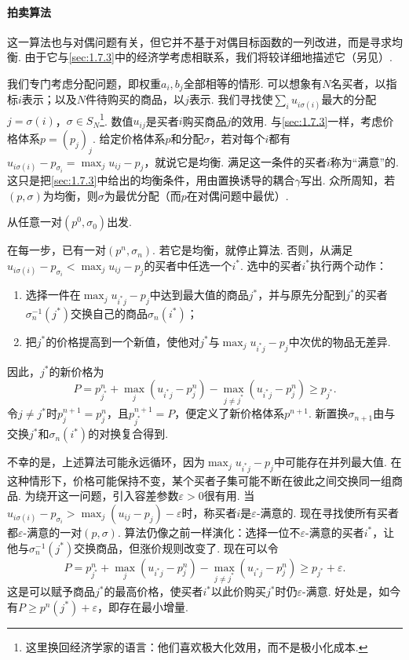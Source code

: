 \paragraph{拍卖算法}
\label{idx:i13-p238}
这一算法也与对偶问题有关，但它并不基于对偶目标函数的一列改进，而是寻求均衡. 由于它与\autoref{sec:1.7.3}中的经济学考虑相联系，我们将较详细地描述它（另见\cite{b53}）.

\label{idx:i11-p238}
我们专门考虑分配问题，即权重$a_i,b_j$全部相等的情形. 可以想象有$N$名买者，以指标$i$表示；以及$N$件待购买的商品，以$j$表示. 我们寻找使$\sum_i u_{i\sigma(i)}$最大的分配$j=\sigma(i)$，$\sigma\in S_N$\footnote{这里换回经济学家的语言：他们喜欢极大化效用，而不是极小化成本.}. 数值$u_{ij}$是买者$i$购买商品$j$的效用. 与\autoref{sec:1.7.3}一样，考虑价格体系$p=(p_j)_j$. \label{idx:i53-p238}
给定价格体系$p$和分配$\sigma$，若对每个$i$都有$u_{i\sigma(i)}-p_{\sigma_i}=\max_j u_{ij}-p_j$，就说它是均衡. 满足这一条件的买者$i$称为“满意”的. 这只是把\autoref{sec:1.7.3}中给出的均衡条件，用由置换诱导的耦合$\gamma$写出. 众所周知，若$(p,\sigma)$为均衡，则$\sigma$为最优分配（而$p$在对偶问题中最优）.

从任意一对$(p^0,\sigma_0)$出发.

在每一步，已有一对$(p^n,\sigma_n)$. 若它是均衡，就停止算法. 否则，从满足$u_{i\sigma(i)}-p_{\sigma_i}<\max_j u_{ij}-p_j$的买者中任选一个$i^*$. 选中的买者$i^*$执行两个动作：
\begin{enumerate}
\item 选择一件在$\max_j u_{i^*j}-p_j$中达到最大值的商品$j^*$，并与原先分配到$j^*$的买者$\sigma_n^{-1}(j^*)$交换自己的商品$\sigma_n(i^*)$；
\item 把$j^*$的价格提高到一个新值，使他对$j^*$与$\max_j u_{i^*j}-p_j$中次优的物品无差异.
\end{enumerate}
因此，$j^*$的新价格为
\[
P=p_{j^*}^n+\max_j(u_{i^*j}-p_j^n)
-\max_{j\ne j^*}(u_{i^*j}-p_j^n)\ge p_{j^*}.
\]
令$j\ne j^*$时$p_j^{n+1}=p_j^n$，且$p_{j^*}^{n+1}=P$，便定义了新价格体系$p^{n+1}$. 新置换$\sigma_{n+1}$由与交换$j^*$和$\sigma_n(i^*)$的对换复合得到.

不幸的是，上述算法可能永远循环，因为$\max_j u_{i^*j}-p_j$中可能存在并列最大值. 在这种情形下，价格可能保持不变，某个买者子集可能不断在彼此之间交换同一组商品. 为绕开这一问题，引入容差参数$\varepsilon>0$很有用. 当$u_{i\sigma(i)}-p_{\sigma_i}>\max_j(u_{ij}-p_j)-\varepsilon$时，称买者$i$是$\varepsilon$-满意的. 现在寻找使所有买者都$\varepsilon$-满意的一对$(p,\sigma)$. 算法仍像之前一样演化：选择一位不$\varepsilon$-满意的买者$i^*$，让他与$\sigma_n^{-1}(j^*)$交换商品，但涨价规则改变了. 现在可以令
\[
P=p_{j^*}^n+\max_j(u_{i^*j}-p_j^n)
-\max_{j\ne j^*}(u_{i^*j}-p_j^n)\ge p_{j^*}+\varepsilon.
\]
这是可以赋予商品$j^*$的最高价格，使买者$i^*$以此价购买$j^*$时仍$\varepsilon$-满意. 好处是，如今有$P\ge p^n(j^*)+\varepsilon$，即存在最小增量.

